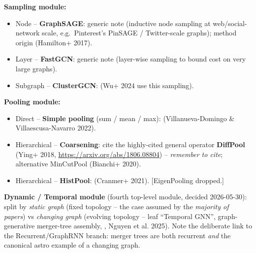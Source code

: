 \textbf{Sampling module:}
\begin{itemize}
    \item Node -- \textbf{GraphSAGE}: generic note (inductive node sampling at
        web/social-network scale, e.g.\ Pinterest's PinSAGE / Twitter-scale
        graphs); method origin \citep{Hamilton2017_GraphSAGE_inductive} (Hamilton+ 2017).
    \item Layer -- \textbf{FastGCN}: generic note (layer-wise sampling to bound
        cost on very large graphs).
    \item Subgraph -- \textbf{ClusterGCN}:
        \citep{Wu2024_galaxyhalo_environment} (Wu+ 2024 use this sampling).
\end{itemize}

\textbf{Pooling module:}
\begin{itemize}
    \item Direct -- \textbf{Simple pooling} (sum / mean / max):
        \citep{VillanuevaDomingo2022_cosmicgraph_clustering} (Villanueva-Domingo \&
        Villaescusa-Navarro 2022).
    \item Hierarchical -- \textbf{Coarsening}: cite the highly-cited general
        operator \textbf{DiffPool \citep{Ying2018_diffpool_pooling}} (Ying+ 2018,
        \url{https://arxiv.org/abs/1806.08804}) -- \emph{remember to cite};
        alternative MinCutPool (Bianchi+ 2020).
    \item Hierarchical -- \textbf{HistPool}: \citep{Cranmer2021_histpool_deepsets}
        (Cranmer+ 2021). [EigenPooling dropped.]
\end{itemize}

\textbf{Dynamic / Temporal module} (fourth top-level module, decided
2026-05-30): split by \emph{static graph} (fixed topology -- the case assumed by the
\emph{majority of papers}) vs \emph{changing graph} (evolving topology -- leaf ``Temporal GNN'',
graph-generative merger-tree assembly, \citep{Nguyen2025_mergertree_generative},
Nguyen et al. 2025). Note the deliberate link
to the Recurrent/GraphRNN branch: merger trees are both recurrent \emph{and}
the canonical astro example of a changing graph.
